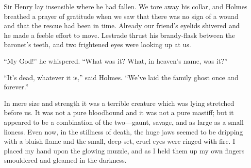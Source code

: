 \documentclass[paper=a5,BCOR=7mm,twoside,DIV=calc,12pt,usegeometry,openany,chapterprefix,endperiod,headings=big]{scrbook} %
\begin{document}
Sir Henry lay insensible where he had fallen. We tore away his collar, and Holmes breathed a prayer of gratitude when we saw that there was no sign of a wound and that the rescue had been in time. Already our friend's eyelids shivered and he made a feeble effort to move. Lestrade thrust his brandy-flask between the baronet's teeth, and two frightened eyes were looking up at us.

\enquote{My God!} he whispered. \enquote{What was it? What, in heaven's name, was it?}

\enquote{It's dead, whatever it is,} said Holmes. \enquote{We've laid the family ghost once and forever.}

In mere size and strength it was a terrible creature which was lying stretched before us. It was not a pure bloodhound and it was not a pure mastiff; but it appeared to be a combination of the two---gaunt, savage, and as large as a small lioness. Even now, in the stillness of death, the huge jaws seemed to be dripping with a bluish flame and the small, deep-set, cruel eyes were ringed with fire. I placed my hand upon the glowing muzzle, and as I held them up my own fingers smouldered and gleamed in the darkness.

\end{document}

